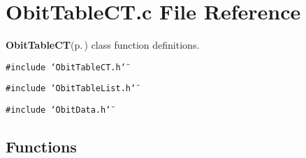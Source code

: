 \section{Obit\-Table\-CT.c File Reference}
\label{ObitTableCT_8c}
{\bf Obit\-Table\-CT}{\rm (p.\,\pageref{structObitTableCT})} class function definitions. 

{\tt \#include \char`\"{}Obit\-Table\-CT.h\char`\"{}}\par
{\tt \#include \char`\"{}Obit\-Table\-List.h\char`\"{}}\par
{\tt \#include \char`\"{}Obit\-Data.h\char`\"{}}\par
\subsection*{Functions}
